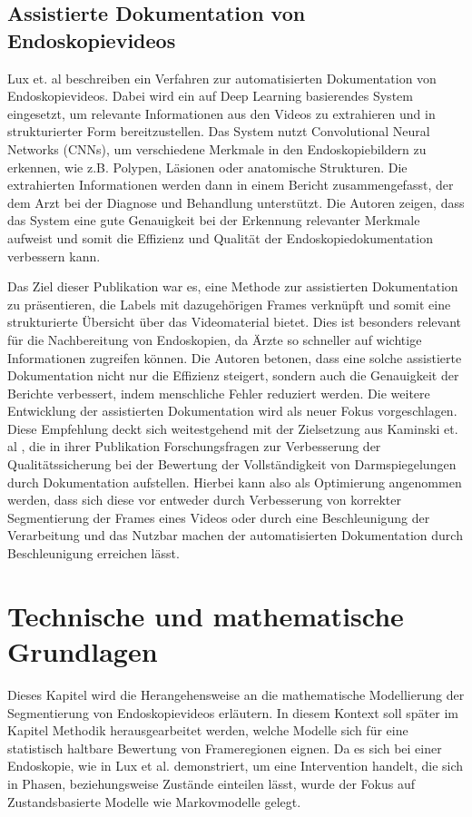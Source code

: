 \subsection{Assistierte Dokumentation von Endoskopievideos}

Lux et. al \citet{lux-2023} beschreiben ein Verfahren zur automatisierten Dokumentation von Endoskopievideos. Dabei wird ein auf Deep Learning basierendes System eingesetzt, um relevante Informationen aus den Videos zu extrahieren und in strukturierter Form bereitzustellen. Das System nutzt Convolutional Neural Networks (CNNs), um verschiedene Merkmale in den Endoskopiebildern zu erkennen, wie z.B. Polypen, Läsionen oder anatomische Strukturen. Die extrahierten Informationen werden dann in einem Bericht zusammengefasst, der dem Arzt bei der Diagnose und Behandlung unterstützt. Die Autoren zeigen, dass das System eine gute Genauigkeit bei der Erkennung relevanter Merkmale aufweist und somit die Effizienz und Qualität der Endoskopiedokumentation verbessern kann.

Das Ziel dieser Publikation war es, eine Methode zur assistierten Dokumentation zu präsentieren, die Labels mit dazugehörigen Frames verknüpft und somit eine strukturierte Übersicht über das Videomaterial bietet. Dies ist besonders relevant für die Nachbereitung von Endoskopien, da Ärzte so schneller auf wichtige Informationen zugreifen können. Die Autoren betonen, dass eine solche assistierte Dokumentation nicht nur die Effizienz steigert, sondern auch die Genauigkeit der Berichte verbessert, indem menschliche Fehler reduziert werden. Die weitere Entwicklung der assistierten Dokumentation wird als neuer Fokus vorgeschlagen. Diese Empfehlung deckt sich weitestgehend mit der Zielsetzung aus Kaminski et. al \citet{kaminski-performance-2017}, die in ihrer Publikation Forschungsfragen zur Verbesserung der Qualitätssicherung bei der Bewertung der Vollständigkeit von Darmspiegelungen durch Dokumentation aufstellen. Hierbei kann also als Optimierung angenommen werden, dass sich diese vor entweder durch Verbesserung von korrekter Segmentierung der Frames eines Videos oder durch eine Beschleunigung der Verarbeitung und das Nutzbar machen der automatisierten Dokumentation durch Beschleunigung erreichen lässt.  

\section{Technische und mathematische Grundlagen}

Dieses Kapitel wird die Herangehensweise an die mathematische Modellierung der Segmentierung von Endoskopievideos erläutern.
In diesem Kontext soll später im Kapitel Methodik herausgearbeitet werden, welche Modelle sich für eine statistisch haltbare Bewertung von Frameregionen eignen. Da es sich bei einer Endoskopie, wie in Lux et al. demonstriert, um eine Intervention handelt, die sich in Phasen, beziehungsweise Zustände einteilen lässt, wurde der Fokus auf Zustandsbasierte Modelle wie Markovmodelle gelegt.

